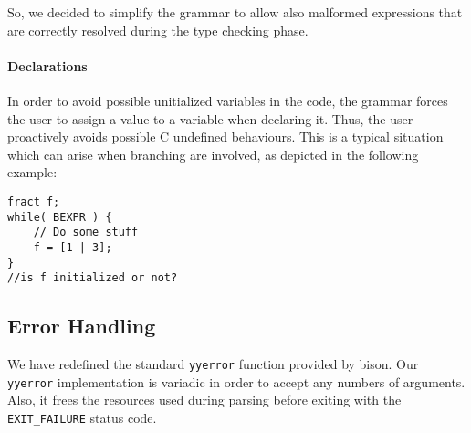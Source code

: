 So, we decided to simplify the grammar to allow also malformed expressions that
are correctly resolved during the type checking phase.


\paragraph{Declarations}

In order to avoid possible unitialized variables in the code, the grammar
forces the user to assign a value to a variable when declaring it.
Thus, the user proactively avoids possible C undefined behaviours.
This is a typical situation which can arise
when branching are involved, as depicted in the following example:
\begin{verbatim}
fract f;
while( BEXPR ) {
    // Do some stuff
    f = [1 | 3];
}
//is f initialized or not?
\end{verbatim}

\subsection{Error Handling}
We have redefined the standard \verb|yyerror| function provided by bison.
Our \verb|yyerror| implementation is variadic in order to accept any numbers of
arguments. Also, it frees the resources used during parsing before exiting with
the \verb|EXIT_FAILURE| \cite{glibc-online} status code.
